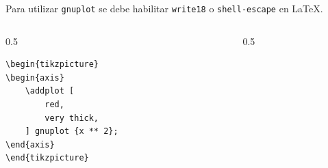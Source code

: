 \documentclass[12pt,aspectratio=169,ignorenonframetext]{ltxbeamer}
\begin{document}
\begin{frame}[fragile]

Para utilizar \texttt{gnuplot} se debe habilitar \texttt{write18} o \texttt{shell-escape} en {\lmr\LaTeX}.

\bigskip

\begin{columns}
    \begin{column}{0.5\textwidth}
        \begin{verbatim}
\begin{tikzpicture}
\begin{axis}
    \addplot [
        red,
        very thick,
    ] gnuplot {x ** 2};
\end{axis}
\end{tikzpicture}
        \end{verbatim}
    \end{column}
    {\color{gray} \vline}
    \begin{column}{0.5\textwidth}
    \end{column}
\end{columns}
\end{frame}
\end{document}
